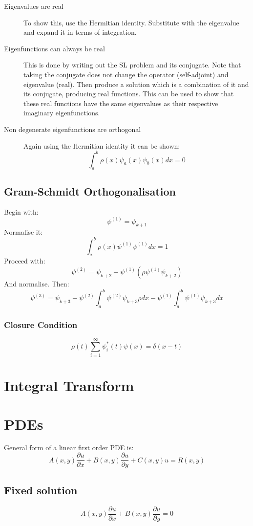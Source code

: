 \documentclass[12pt]{article}
\begin{document}
\begin{description}
    \item [Eigenvalues are real] To show this, use the Hermitian identity. Substitute with the eigenvalue and expand it in terms of integration.
    \item [Eigenfunctions can always be real] This is done by writing out the SL problem and its conjugate. Note that taking the conjugate does not change the operator (self-adjoint) and eigenvalue (real). Then produce a solution which is a combination of it and its conjugate, producing real functions. This can be used to show that these real functions have the same eigenvalues as their respective imaginary eigenfunctions.
    \item [Non degenerate eigenfunctions are orthogonal] Again using the Hermitian identity it can be shown:
    \[\int_a^b \rho(x) \psi_a(x)\psi_b(x)dx = 0\]
\end{description}

\subsection{Gram-Schmidt Orthogonalisation}
Begin with:
\[\psi^{(1)}=\psi_{k+1}\]
Normalise it:
\[ \int^b_a \rho(x) \psi^{(1)}\psi^{(1)}dx =1\]
Proceed with:
\[\psi^{(2)}=\psi_{k+2}-\psi^{(1)}\left(\rho\psi^{(1)}\psi_{k+2}\right)\]
And normalise. Then:
\[\psi^{(3)} = \psi_{k+3} -\psi^{(2)}\int^b_a\psi^{(2)}\psi_{k+3}\rho dx  - \psi^{(1)}\int^b_a \psi^{(1)}\psi_{k+3}dx\]

\subsubsection{Closure Condition}
\[ \rho(t) \sum_{i=1}^\infty \psi^*_i(t)\psi(x)=\delta(x-t)\]


\section{Integral Transform}


\section{PDEs}

General form of a linear first order PDE is:
\[A(x,y)\frac{\partial u}{\partial x} + B(x,y)\frac{\partial u}{\partial y}+C(x,y)u = R(x,y)\]

\subsection{Fixed solution}
\[A(x,y)\frac{\partial u}{\partial x} + B(x,y)\frac{\partial u}{\partial y} =0\]
\end{document}
